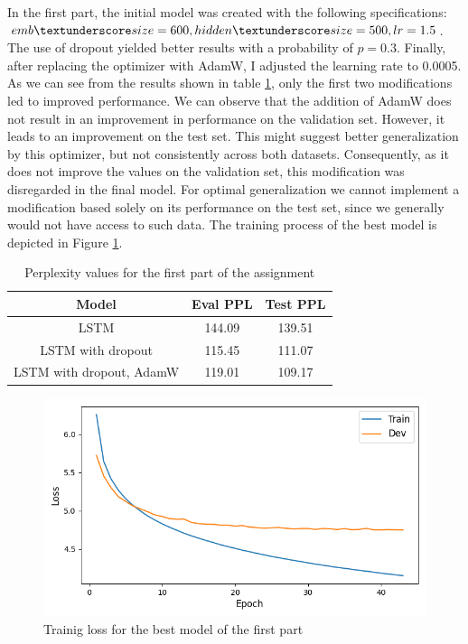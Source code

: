 \documentclass[a4paper]{article}
\begin{document}
In the first part, the initial model was created with the following specifications: \(emb \textunderscore size=600, hidden \textunderscore size=500, lr=1.5\).
The use of dropout yielded better results with a probability of \(p=0.3\). Finally, after replacing the optimizer with AdamW, I adjusted the learning rate to 0.0005.
As we can see from the results shown in table \ref{tab:results1}, only the first two modifications led to improved performance. 
We can observe that the addition of AdamW does not result in an improvement in performance on the validation set. However, it leads to an improvement on the test set. This might suggest better generalization by this optimizer, but not consistently across both datasets. Consequently, as it does not improve the values on the validation set, this modification was disregarded in the final model. For optimal generalization we cannot implement a modification based solely on its performance on the test set, since we generally would not have access to such data.
The training process of the best model is depicted in Figure \ref{fig:fig1}.

\begin{table}[h]
  \centering
  \begin{tabular}{|c|c|c|}
    \hline
    \textbf{Model} & \textbf{Eval PPL} & \textbf{Test PPL} \\
    \hline
    LSTM & 144.09 & 139.51 \\
    LSTM with dropout & 115.45 & 111.07 \\
    LSTM with dropout, AdamW & 119.01 & 109.17\\
    \hline
  \end{tabular}
  \caption{Perplexity values for the first part of the assignment}
  \label{tab:results1}

\end{table}

\begin{figure}[h]
  \includegraphics[width=\linewidth]{./images/plot_1_loss.png}
  \caption{Trainig loss for the best model of the first part}
  \label{fig:fig1}
\end{figure}
\end{document}

